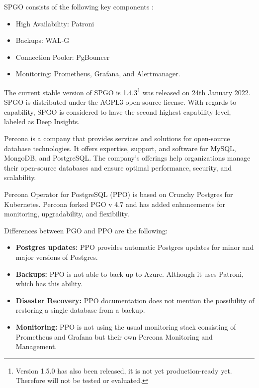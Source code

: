 SPGO consists of the following key components \cite{PostgresOnKubernetes}:
\begin{itemize}
  \item High Availability: Patroni
  \item Backups: WAL-G
  \item Connection Pooler: PgBouncer
  \item Monitoring: Prometheus, Grafana, and Alertmanager.
\end{itemize}


The current stable version of SPGO is 1.4.3\footnote[2]{Version 1.5.0 has also been released, it is not yet production-ready yet. Therefore will not be tested or evaluated.} was released on 24th January 2022. \cite{SPGOgitlabChangelog} SPGO is distributed under the AGPL3 open-source license. \cite{SPGODocuLicence}
With regards to capability, SPGO is considered to have the second highest capability level, labeled as Deep Insights. \cite{OperatorHubStackgres}

Percona is a company that provides services and solutions for open-source database technologies. It offers expertise, support, and software for MySQL, MongoDB, and PostgreSQL. The company's offerings help organizations manage their open-source databases and ensure optimal performance, security, and scalability. \cite{Percona}

Percona Operator for PostgreSQL (PPO) is based on Crunchy Postgres for Kubernetes. Percona forked PGO v 4.7 and has added enhancements for monitoring, upgradability, and flexibility. \cite{PerconaBlogProsAndCons}

Differences between PGO and PPO are the following:
\begin{itemize}
  \item \textbf{Postgres updates:} PPO provides automatic Postgres updates for minor and major versions of Postgres.  \cite{PerconaDocuUpdate}
  \item \textbf{Backups:} PPO is not able to back up to Azure. \cite{PerconaDocuCompare} Although it uses Patroni, which has this ability.
  \item \textbf{Disaster Recovery:} PPO documentation does not mention the possibility of restoring a single database from a backup. \cite{PerconaDocuBackups}
  \item \textbf{Monitoring:} PPO is not using the usual monitoring stack consisting of Prometheus and Grafana but their own Percona Monitoring and Management. \cite{PerconaDocuMonitoring}
\end{itemize}


